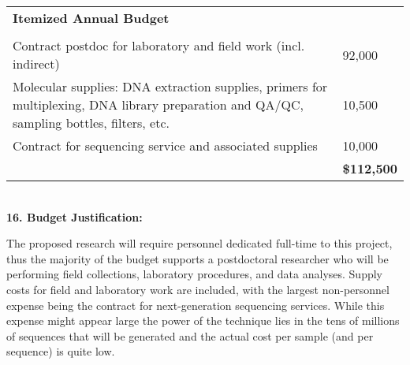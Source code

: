 \documentclass[]{article}
\begin{document}
\begin{longtable}[]{@{}ll@{}}
\toprule
\begin{minipage}[t]{0.48\columnwidth}\raggedright\strut
\textbf{Itemized Annual Budget}\strut
\end{minipage} & \begin{minipage}[t]{0.48\columnwidth}\raggedright\strut
\textbf{}\\
\strut
\end{minipage}\tabularnewline
\begin{minipage}[t]{0.47\columnwidth}\raggedright\strut
Contract postdoc for laboratory and field work (incl. indirect)\strut
\end{minipage} & \begin{minipage}[t]{0.47\columnwidth}\raggedright\strut
92,000\strut
\end{minipage}\tabularnewline
\begin{minipage}[t]{0.47\columnwidth}\raggedright\strut
Molecular supplies: DNA extraction supplies, primers for multiplexing,
DNA library preparation and QA/QC, sampling bottles, filters, etc.\strut
\end{minipage} & \begin{minipage}[t]{0.47\columnwidth}\raggedright\strut
10,500\strut
\end{minipage}\tabularnewline
\begin{minipage}[t]{0.47\columnwidth}\raggedright\strut
Contract for sequencing service and associated supplies\strut
\end{minipage} & \begin{minipage}[t]{0.47\columnwidth}\raggedright\strut
10,000\strut
\end{minipage}\tabularnewline
\begin{minipage}[t]{0.47\columnwidth}\raggedright\strut
\strut
\end{minipage} & \begin{minipage}[t]{0.47\columnwidth}\raggedright\strut
\textbf{{ }\$112,500}\strut
\end{minipage}\tabularnewline
\bottomrule
\end{longtable}

\textbf{}\\

\textbf{16. Budget Justification:} {~}

The proposed research will require personnel dedicated full-time to this
project, thus the majority of the budget supports a postdoctoral
researcher who will be performing field collections, laboratory
procedures, and data analyses. Supply costs for field and laboratory
work are included, with the largest non-personnel expense being the
contract for next-generation sequencing services. While this expense
might appear large the power of the technique lies in the tens of
millions of sequences that will be generated and the actual cost per
sample (and per sequence) is quite low. {~}
\end{document}
